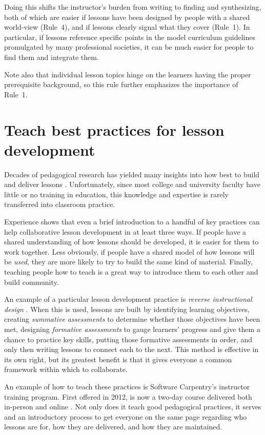 \documentclass[10pt,letterpaper]{article}
\newcommand{\rulemajor}[1]{\section{#1}}
\begin{document}
Doing this shifts the instructor's burden from writing to finding and synthesizing,
both of which are easier if lessons have been designed by people with a shared world-view (Rule~4),
and if lessons clearly signal what they cover (Rule~1).
In particular,
if lessons reference specific points in the model curriculum guidelines promulgated by many professional societies,
it can be much easier for people to find them and integrate them.

Note also that individual lesson topics hinge on the learners having the proper prerequisite background,
so this rule further emphasizes the importance of Rule~1.

\rulemajor{Teach best practices for lesson development}

Decades of pedagogical research has yielded many insights into
how best to build and deliver lessons \cite{hlw}.
Unfortunately,
since most college and university faculty have little or no training in education,
this knowledge and expertise is rarely transferred into classroom practice.

Experience shows that even a brief introduction to a handful of key practices
can help collaborative lesson development in at least three ways.
If people have a shared understanding of how lessons should be developed,
it is easier for them to work together.
Less obviously,
if people have a shared model of how lessons will be \emph{used},
they are more likely to try to build the same kind of material.
Finally,
teaching people how to teach is a great way to introduce them to each other and build community.

An example of a particular lesson development practice is \emph{reverse instructional design}
\cite{wiggins-mctighe}.
When this is used,
lessons are built by
identifying learning objectives,
creating \emph{summative assessments} to determine whether those objectives have been met,
designing \emph{formative assessments} to gauge learners' progress
and give them a chance to practice key skills,
putting those formative assessments in order,
and only then writing lessons to connect each to the next.
This method is effective in its own right,
but its greatest benefit is that it gives everyone a common framework
within which to collaborate.

An example of how to teach these practices is Software Carpentry's instructor training program.
First offered in 2012,
is now a two-day course delivered both in-person and online
\cite{lessons-learned,instructor-training,how-to-teach-programming}.
Not only does it teach good pedagogical practices,
it serves and an introductory process to get everyone on the same page
regarding who lessons are for,
how they are delivered,
and how they are maintained.
\end{document}
